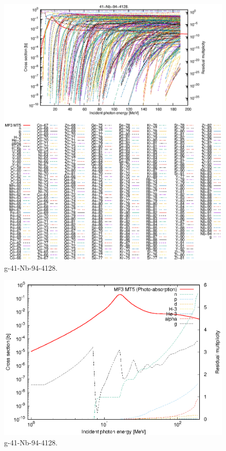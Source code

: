 \begin{figure}
 \includegraphics[width=\linewidth]{eps/g_41-Nb-94_4128.eps}
  \caption{g-41-Nb-94-4128.}
\end{figure}
\newpage \clearpage

\begin{figure}
 \includegraphics[width=\linewidth]{eps-log/g_41-Nb-94_4128.eps}
 \caption{g-41-Nb-94-4128.}
\end{figure}
\newpage \clearpage

